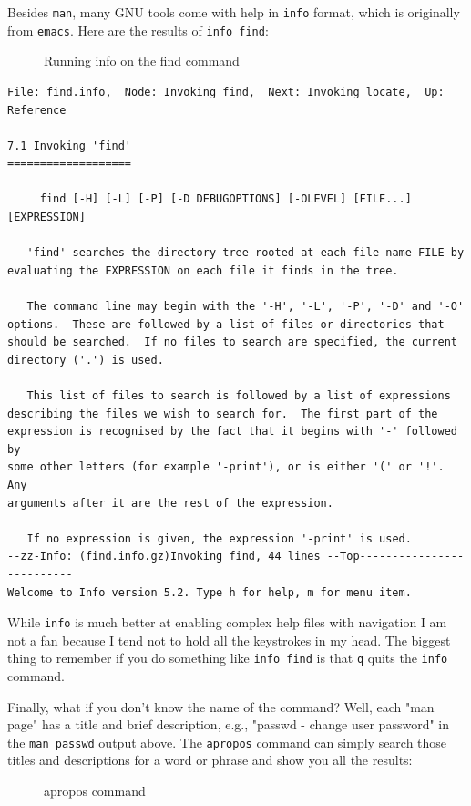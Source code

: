 \documentclass[10pt,]{book}
\numberwithin{figure}{chapter}
\DeclareRobustCommand{\drcap}[1]{\begin{figure}[H]\caption{#1}\end{figure}}
\DeclareRobustCommand{\drcmd}[1]{\index{Commands!#1}}
\begin{document}
Besides \texttt{man}, many GNU tools come with help in
\texttt{info}\drcmd{info} format, which is originally from
\texttt{emacs}. Here are the results of \texttt{info find}:

\drcap{Running info on the find command}

\begin{verbatim}
File: find.info,  Node: Invoking find,  Next: Invoking locate,  Up: Reference

7.1 Invoking 'find'
===================

     find [-H] [-L] [-P] [-D DEBUGOPTIONS] [-OLEVEL] [FILE...] [EXPRESSION]

   'find' searches the directory tree rooted at each file name FILE by
evaluating the EXPRESSION on each file it finds in the tree.

   The command line may begin with the '-H', '-L', '-P', '-D' and '-O'
options.  These are followed by a list of files or directories that
should be searched.  If no files to search are specified, the current
directory ('.') is used.

   This list of files to search is followed by a list of expressions
describing the files we wish to search for.  The first part of the
expression is recognised by the fact that it begins with '-' followed by
some other letters (for example '-print'), or is either '(' or '!'.  Any
arguments after it are the rest of the expression.

   If no expression is given, the expression '-print' is used.
--zz-Info: (find.info.gz)Invoking find, 44 lines --Top--------------------------
Welcome to Info version 5.2. Type h for help, m for menu item.
\end{verbatim}

While \texttt{info} is much better at enabling complex help files with
navigation I am not a fan because I tend not to hold all the keystrokes
in my head. The biggest thing to remember if you do something like
\texttt{info find} is that \texttt{q} quits the \texttt{info} command.

Finally, what if you don't know the name of the command? Well, each "man
page" has a title and brief description, e.g., "passwd - change user
password" in the \texttt{man passwd} output above. The \texttt{apropos}
command can simply search those titles and descriptions for a word or
phrase and show you all the results:

\drcap{apropos command}
\end{document}
